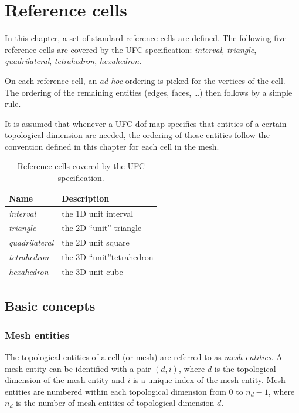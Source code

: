 \chapter{Reference cells}

In this chapter, a set of standard reference cells are defined.
The following five reference cells are covered by the UFC specification:
\emph{interval},
\emph{triangle},
\emph{quadrilateral},
\emph{tetrahedron},
\emph{hexahedron}.

On each reference cell, an \emph{ad-hoc} ordering is picked for the
vertices of the cell. The ordering of the remaining entities (edges,
faces, \ldots) then follows by a simple rule.

It is assumed that whenever a UFC dof map specifies that entities of a
certain topological dimension are needed, the ordering of those
entities follow the convention defined in this chapter for each cell
in the mesh.

\begin{table}[H]
  \begin{center}
    \begin{tabular}{|l|l|}
      \hline
      Name & Description \\
      \hline
      \hline
      \emph{interval}      & the 1D unit interval \\
      \hline
      \emph{triangle}      & the 2D ``unit'' triangle \\
      \hline
      \emph{quadrilateral} & the 2D unit square \\
      \hline
      \emph{tetrahedron}   & the 3D ``unit''tetrahedron \\
      \hline
      \emph{hexahedron}    & the 3D unit cube \\
      \hline
    \end{tabular}
    \caption{Reference cells covered by the UFC specification.}
  \end{center}
\end{table}

\section{Basic concepts}

\subsection{Mesh entities}

The topological entities of a cell (or mesh) are referred to as
\emph{mesh entities}. A mesh entity can be identified with a pair
$(d, i)$, where $d$ is the topological dimension of the mesh entity and $i$
is a unique index of the mesh entity. Mesh entities are numbered
within each topological dimension from $0$ to $n_d-1$, where $n_d$ is
the number of mesh entities of topological dimension $d$.


